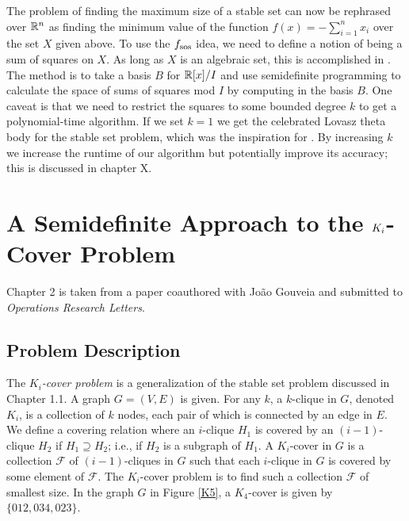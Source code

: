 The problem of finding the maximum size of a stable set can now be rephrased over $\mathbb{R}^n$ as finding the minimum value of the function $f(x) = - \sum_{i=1}^n x_i$ over the set $X$ given above. 
To use the $f_{\textup{sos}}$ idea, we need to define a notion of being a sum of squares on $X$. As long as $X$ is an algebraic set, this is accomplished in \cite{glpt}. 
The method is to take a basis $B$ for $\mathbb{R}[x]/I$ and use semidefinite programming to calculate the space of sums of squares mod $I$ by computing in the basis $B$.
One caveat is that we need to restrict the squares to some bounded degree $k$ to get a polynomial-time algorithm. 
If we set $k=1$ we get the celebrated Lovasz theta body for the stable set problem, which was the inspiration for \cite{glpt}. 
By increasing $k$ we increase the runtime of our algorithm but potentially improve its accuracy; this is discussed in chapter X. 

\section{A Semidefinite Approach to the $K_\MakeLowercase{i}$-Cover Problem}
Chapter 2 is taken from a paper coauthored with Jo\~ao Gouveia and submitted to \emph{Operations Research Letters}. 

\subsection{Problem Description}

The {\em $K_i$-cover problem} is a generalization of the stable set problem discussed in Chapter 1.1. 
A graph $G = (V,E)$ is given. 
For any $k$, a $k$-clique in $G$, denoted $K_i$, is a collection of $k$ nodes, each pair of which is connected by an edge in $E$.
We define a covering relation where an $i$-clique $H_1$ is covered by an $(i-1)$-clique $H_2$ if $H_1 \supseteq H_2$; i.e., if $H_2$ is a subgraph of $H_1$. 
A $K_i$-cover in $G$ is a collection $\mathcal{F}$ of $(i-1)$-cliques in $G$ such that each $i$-clique in $G$ is covered by some element of $\mathcal{F}$. 
The $K_i$-cover problem is to find such a collection $\mathcal{F}$ of smallest size.
In the graph $G$ in Figure \ref{K5}, a $K_4$-cover is given by $\{012,034,023\}$.

